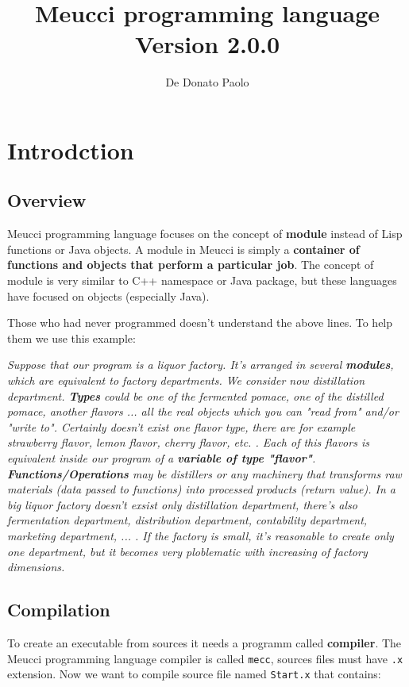 \documentclass[10pt]{book}%
\author{De Donato Paolo}
\title{\textbf{\huge Meucci programming language\\
\large Version 2.0.0}}
\date{}
\newcommand{\code}[1]{\texttt{#1}}
\renewcommand{\emph}[1]{\textbf{#1}}
\begin{document}
\maketitle
\tableofcontents
\chapter{Introdction}
\section{Overview}
Meucci programming language focuses on the concept of \emph{module} instead of Lisp functions or Java objects. A module in Meucci is simply a \emph{container of functions and objects that perform a particular job}. The concept of module is very similar to C++ namespace or Java package, but these languages have focused on objects (especially Java).

Those who had never programmed doesn't understand the above lines. To help them we use this example:

\textit{Suppose that our program is a liquor factory. It's arranged in several \textbf{modules}, which are equivalent to factory departments. We consider now distillation department. \textbf{Types} could be one of the fermented pomace, one of the distilled pomace, another flavors ... all the real objects which you can "read from" and/or "write to". Certainly doesn't exist one flavor type, there are for example strawberry flavor, lemon flavor, cherry flavor, etc. . Each of this flavors is equivalent inside our program of a \textbf{variable of type "flavor"}. \textbf{Functions/Operations} may be distillers or any machinery that transforms raw materials (data passed to functions) into processed products (return value). In a big liquor factory doesn't exsist only distillation department, there's also fermentation department, distribution department, contability department, marketing department, ... . If the factory is small, it's reasonable to create only one department, but it becomes very ploblematic with increasing of factory dimensions.}

\section{Compilation}
To create an executable from sources it needs a programm called \emph{compiler}. The Meucci programming language compiler is called \code{mecc}, sources files must have \code{.x} extension. Now we want to compile source file named \code{Start.x} that contains:
\end{document}

